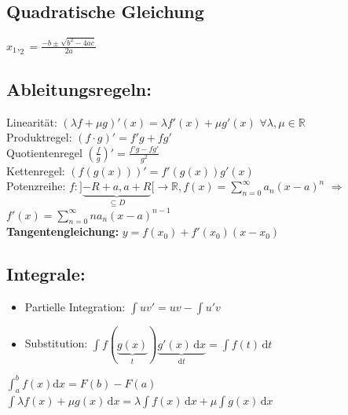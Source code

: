 \documentclass[6pt,a4paper]{scrartcl}
\newcommand{\enbrace}[1]{\ensuremath{\left(#1\right)}}
\begin{document}
\begin{multicols*}{4}
    \subsection{Quadratische Gleichung}
    $x_1,_2 = \frac{-b \pm \sqrt{b^2 - 4ac}}{2a}$

    \subsection{Ableitungsregeln:}
    Linearität: $(\lambda f + \mu g)' (x) = \lambda f'(x) + \mu g'(x)$ \quad $\forall \lambda, \mu \in \mathbb R$ \\
    Produktregel: $(f \cdot g)' = f' g + f g'$\\
    Quotientenregel $\enbrace{\frac{f}{g}}' = \frac{f'g - fg'}{g^2}$\\
    Kettenregel: $\left( f(g(x)) \right)' = f'(g(x)) g'(x)$\\
    Potenzreihe: $f: ] \underbrace{-R+a, a+R}_{\subseteq D}     [ \rightarrow \mathbb R, f(x) = \sum_{n=0}^{\infty} a_n (x -a)^n$ \quad $\Rightarrow$ \quad $f'(x) = \sum_{n=0}^{\infty} n a_{n} (x-a)^{n-1}$\\
    \textbf{Tangentengleichung:} $y=f(x_0)+f'(x_0)(x-x_0)$
    \fi

    \subsection{Integrale:}
    \begin{itemize}\itemsep-1pt
        \item Partielle Integration: $\int uv'=uv-\int u'v$
        \item Substitution: $\int f(\underbrace {g(x)}_{t}) \underbrace {g'(x)\,\mathrm dx}_{\mathrm dt}=\int f(t)\, \mathrm dt$
    \end{itemize}

    $\int_a^b f(x) \mathrm dx = F(b) - F(a)$\\
    $\int\lambda f(x)+\mu g(x) \, \mathrm dx=\lambda\int f(x) \, \mathrm dx + \mu\int g(x) \, \mathrm dx$


\end{multicols*}
\end{document}
